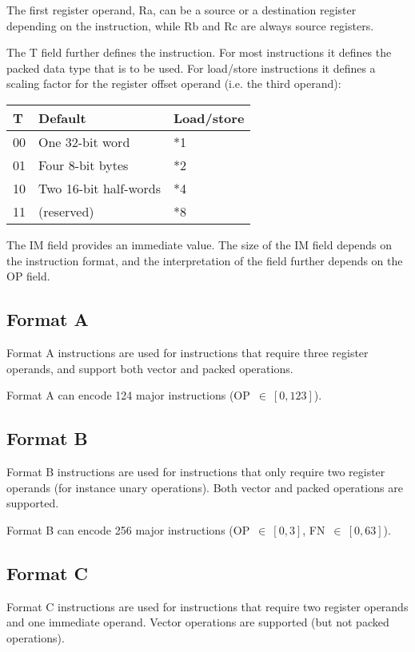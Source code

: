 The first register operand, Ra, can be a source or a destination register
depending on the instruction, while Rb and Rc are always source registers.

The T field further defines the instruction. For most instructions it defines
the packed data type that is to be used. For load/store instructions it
defines a scaling factor for the register offset operand (i.e. the third
operand):

\begin{tabular}{|l|l|l|}
  \hline
  \textbf{T} & \textbf{Default} & \textbf{Load/store} \\
  \hline
  00 & One 32-bit word & *1 \\
  \hline
  01 & Four 8-bit bytes & *2 \\
  \hline
  10 & Two 16-bit half-words & *4 \\
  \hline
  11 & (reserved) & *8 \\
  \hline
\end{tabular}

The IM field provides an immediate value. The size of the IM field depends on
the instruction format, and the interpretation of the field further depends on
the OP field.

\subsection{Format A}

Format A instructions are used for instructions that require three register
operands, and support both vector and packed operations.

Format A can encode 124 major instructions (OP~$\in~[0,123]$).

\subsection{Format B}

Format B instructions are used for instructions that only require two register
operands (for instance unary operations). Both vector and packed operations are
supported.

Format B can encode 256 major instructions (OP~$\in~[0,3]$, FN~$\in~[0,63]$).

\subsection{Format C}

Format C instructions are used for instructions that require two register
operands and one immediate operand. Vector operations are supported (but not
packed operations).

